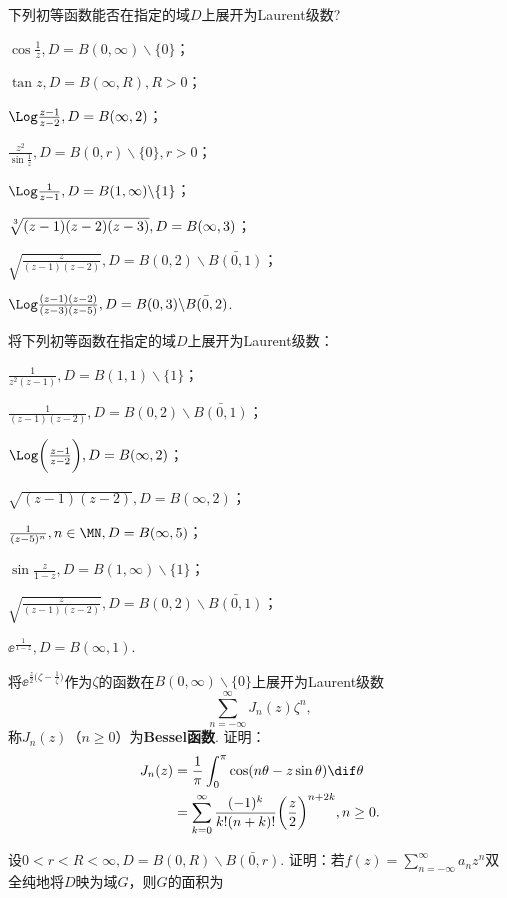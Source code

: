 \begin{xiti}
\item 下列初等函数能否在指定的域$D$上展开为Laurent级数?
\begin{enuma}
  \item $\cos\frac1z,D=B(0,\infty)\backslash\{0\}$；
  \item $\tan z,D=B(\infty,R),R>0$；
  \item $\Log\frac{z-1}{z-2},D=B(\infty,2)$；
  \item $\frac{z^2}{\sin\frac1z},D=B(0,r)\backslash\{0\},r>0$；
  \item $\Log\frac1{z-1},D=B(1,\infty)\backslash\{1\}$；
  \item $\sqrt[\leftroot{-1}\uproot{2}3]{(z-1)(z-2)(z-3)},D=B(\infty,3)$；
  \item $\sqrt{\frac z{(z-1)(z-2)}},D=B(0,2)\backslash\bar{B(0,1)}$；
  \item $\Log\frac{(z-1)(z-2)}{(z-3)(z-5)},D=B(0,3)\backslash\bar{B(0,2)}$.
\end{enuma}
\item 将下列初等函数在指定的域$D$上展开为Laurent级数：
\begin{enuma}
  \item $\frac1{z^2(z-1)},D=B(1,1)\backslash\{1\}$；
  \item $\frac1{(z-1)(z-2)},D=B(0,2)\backslash\bar{B(0,1)}$；
  \item $\Log\bigg(\frac{z-1}{z-2}\bigg),D=B(\infty,2)$；
  \item $\sqrt{(z-1)(z-2)},D=B(\infty,2)$；
  \item $\frac1{(z-5)^n},n\in\MN,D=B(\infty,5)$；
  \item $\sin\frac z{1-z},D=B(1,\infty)\backslash\{1\}$；
  \item $\sqrt{\frac z{(z-1)(z-2)}},D=B(0,2)\backslash\bar{B(0,1)}$；
  \item $\ee^{\frac1{1-z}},D=B(\infty,1)$.
\end{enuma}
\item 将$\ee^{\frac z2\big(\zeta-\frac1\zeta\big)}$作为$\zeta$的函数在$B(0,\infty)\backslash\{0\}$上展开为Laurent级数
    \[\sum_{n=-\infty}^\infty J_n(z)\zeta^n,\]
称$J_n(z)$（$n\ge0$）为\textbf{Bessel函数}. 证明：
\begin{align*}
J_n(z)&=\frac1\pi\int_0^\pi\cos(n\theta-z\sin\theta)\dif \theta\\
&=\sum_{k=0}^\infty\frac{(-1)^k}{k!(n+k)!}\bigg(\frac z2\bigg)^{n+2k},n\ge0.
\end{align*}
\item \hypertarget{xiti5.1.4}{} 设$0<r<R<\infty,D=B(0,R)\backslash\bar{B(0,r)}$. 证明：若$f(z)=\sum_{n=-\infty}^\infty a_nz^n$双全纯地将$D$映为域$G$，则$G$的面积为

\end{xiti}
